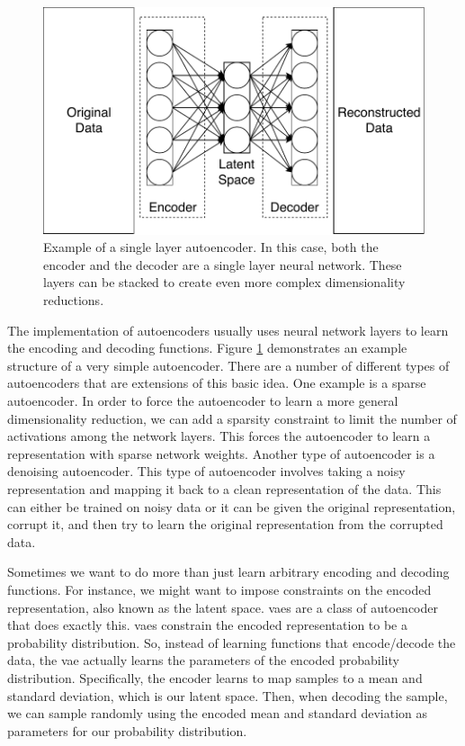 \begin{figure}[t!]
\begin{center}
\includegraphics{figs/Autoencoder.pdf}
\caption{Example of a single layer autoencoder.
In this case, both the encoder and the decoder are a single layer neural network.
These layers can be stacked to create even more complex dimensionality reductions.}
\end{center}
\label{fig:ae}
\end{figure}

The implementation of autoencoders usually uses neural network layers to learn the encoding and decoding functions.
Figure \ref{fig:ae} demonstrates an example structure of a very simple autoencoder.
There are a number of different types of autoencoders that are extensions of this basic idea.
One example is a sparse autoencoder.
In order to force the autoencoder to learn a more general dimensionality reduction, we can add a sparsity constraint to limit the number of activations among the network layers.
This forces the autoencoder to learn a representation with sparse network weights.
Another type of autoencoder is a denoising autoencoder.
This type of autoencoder involves taking a noisy representation and mapping it back to a clean representation of the data.
This can either be trained on noisy data or it can be given the original representation, corrupt it, and then try to learn the original representation from the corrupted data.

Sometimes we want to do more than just learn arbitrary encoding and decoding functions.
For instance, we might want to impose constraints on the encoded representation, also known as the latent space.
\glspl{vae} are a class of autoencoder that does exactly this.
\glspl{vae} constrain the encoded representation to be a probability distribution.
So, instead of learning functions that encode/decode the data, the \gls{vae} actually learns the parameters of the encoded probability distribution.
Specifically, the encoder learns to map samples to a mean and standard deviation, which is our latent space.
Then, when decoding the sample, we can sample randomly using the encoded mean and standard deviation as parameters for our probability distribution.

